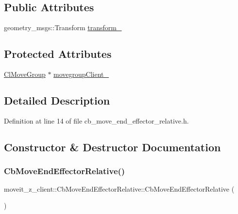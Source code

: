 \subsection*{Public Attributes}
\begin{DoxyCompactItemize}
\item 
geometry\+\_\+msgs\+::\+Transform \hyperlink{classmoveit__z__client_1_1CbMoveEndEffectorRelative_a0686340d0328df4d0ecb962b61026f43}{transform\+\_\+}
\end{DoxyCompactItemize}
\subsection*{Protected Attributes}
\begin{DoxyCompactItemize}
\item 
\hyperlink{classmoveit__z__client_1_1ClMoveGroup}{Cl\+Move\+Group} $\ast$ \hyperlink{classmoveit__z__client_1_1CbMoveEndEffectorRelative_a5f009b3baaaa47ad3be09d43bab33c07}{movegroup\+Client\+\_\+}
\end{DoxyCompactItemize}


\subsection{Detailed Description}


Definition at line 14 of file cb\+\_\+move\+\_\+end\+\_\+effector\+\_\+relative.\+h.



\subsection{Constructor \& Destructor Documentation}
\mbox{\label{classmoveit__z__client_1_1CbMoveEndEffectorRelative_aeabc32977cfd2e7bc34eef1cfd27d8a6}} 
\subsubsection{\texorpdfstring{Cb\+Move\+End\+Effector\+Relative()}{CbMoveEndEffectorRelative()}\hspace{0.1cm}{\footnotesize\ttfamily [1/2]}}
{\footnotesize\ttfamily moveit\+\_\+z\+\_\+client\+::\+Cb\+Move\+End\+Effector\+Relative\+::\+Cb\+Move\+End\+Effector\+Relative (\begin{DoxyParamCaption}{ }\end{DoxyParamCaption})}



